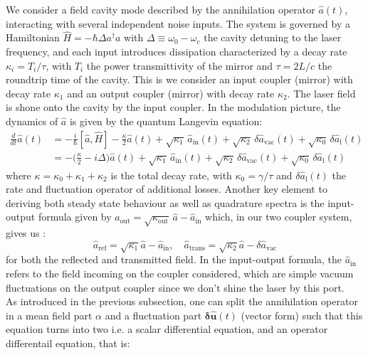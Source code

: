 We consider a field cavity mode described by the annihilation operator \(\hat{a}(t)\), interacting with several independent noise inputs. The system is governed by a Hamiltonian \(\hat{H} = - \hbar \Delta  a^\dagger a \) with  $\Delta\equiv\omega_0 - \omega_c$ the cavity detuning to the laser frequency, and each input introduces dissipation characterized by a decay rate \(\kappa_i = T_i/\tau\), with $T_i$ the power transmittivity of the mirror and $\tau=2L/c$ the roundtrip time of the cavity. This is we consider an input coupler (mirror) with decay rate $\kappa_1$ and an output coupler (mirror) with decay rate $\kappa_2$. The laser field is shone onto the cavity by the input coupler. In the modulation picture, the dynamics of \(\hat{a}\) is given by the quantum Langevin equation:
%
\begin{equation}
\begin{split}
  \frac{d}{dt} \hat{a}(t) & = -\frac{i}{\hbar} [\hat{a}, \hat{H}] - \frac{\kappa}{2} \hat{a}(t) + \sqrt{\kappa_1} \, \hat{a}_{\mathrm{in}}(t)  + \sqrt{\kappa_2} \, \delta \hat{a}_{\mathrm{vac}}(t) + \sqrt{\kappa_0} \, \delta \hat{a}_{\mathrm{l}}(t) \\
  & = -\Big(\frac{\kappa}{2}-i\Delta\Big) \hat{a}(t) + \sqrt{\kappa_{\mathrm{1}}} \, \hat{a}_{\mathrm{in}}(t)  + \sqrt{\kappa_2} \, \delta \hat{a}_{\mathrm{vac}}(t)  + \sqrt{\kappa_0} \, \delta \hat{a}_{\mathrm{l}}(t) 
\label{eq:qle}
\end{split}
\end{equation}
where  \(\kappa = \kappa_0 + \kappa_1 + \kappa_2\) is the total decay rate, with $\kappa_0=\gamma/\tau$ and $ \delta \hat{a}_{\mathrm{l}}(t)$ the rate and fluctuation operator of additional losses. Another key element to deriving both steady state behaviour as well as quadrature spectra is the input-output formula given by $\hat{a}_{\mathrm{out}} = \sqrt{\kappa_{\mathrm{out}}} \, \hat{a} - \hat{a}_{\mathrm{in}} $ which, in our two coupler system, gives us :
\begin{equation}
  \hat{a}_{\mathrm{ref}} = \sqrt{\kappa_{1}}\hat{a} - \hat{a}_{\mathrm{in}} , \quad \hat{a}_{\mathrm{trans}} = \sqrt{\kappa_{2}}\hat{a} - \delta \hat{a}_{\mathrm{vac}} 
\end{equation}
for both the reflected and transmitted field. In the input-output formula, the $\hat{a}_{\mathrm{in}}$ refers to the field incoming on the coupler considered, which are simple vacuum fluctuations on the output coupler since we don't shine the laser by this port.\\
As introduced in the previous subsection, one can split the annihilation operator in a mean field part $\alpha$ and a fluctuation part $\mathbf{\delta \hat{u}}(t)$ (vector form) such that this equation turns into two i.e. a scalar differential equation, and an operator differentail equation, that is:
